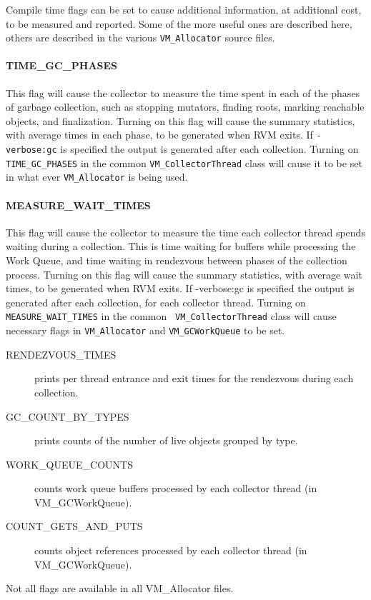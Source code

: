 Compile time flags can be set to cause additional information, at additional
cost, to be measured and reported.  Some of the more useful ones are
described here, others are described in the various {\tt VM\_Allocator}
source files.

\paragraph{TIME\_GC\_PHASES}
This flag will cause the collector to measure the time spent in each
of the phases of garbage collection, such as stopping mutators, finding roots,
marking reachable objects, and finalization.  Turning on this flag will cause
the summary statistics, with average times in each phase, to be generated 
when RVM exits.  If {\tt -verbose:gc} is specified the output is generated after
each collection. Turning on {\tt TIME\_GC\_PHASES} in the common 
{\tt VM\_CollectorThread}
class will cause it to be set in what ever 
{\tt VM\_Allocator} is being used.

\paragraph{MEASURE\_WAIT\_TIMES}
This flag will cause the collector to measure the time each collector thread
spends waiting during a collection.  This is time waiting for buffers while
processing the Work Queue, and time waiting in rendezvous between phases of the
collection process. Turning on this flag will cause
the summary statistics, with average wait times, to be generated 
when RVM exits.  If -verbose:gc is specified the output is generated after
each collection, for each collector thread.
Turning on {\tt MEASURE\_WAIT\_TIMES} in the common {\tt
VM\_CollectorThread}
class will cause necessary flags in {\tt VM\_Allocator} and 
{\tt VM\_GCWorkQueue} to be set.

\begin{description}
\item[RENDEZVOUS\_TIMES] prints per thread entrance and exit times for the
rendezvous during each collection.
\item[GC\_COUNT\_BY\_TYPES] prints counts of the number of live objects grouped
by type.
\item[WORK\_QUEUE\_COUNTS] counts work queue buffers processed by each collector
thread (in VM\_GCWorkQueue). 
\item[COUNT\_GETS\_AND\_PUTS] counts object references processed by each collector
thread (in VM\_GCWorkQueue). 
\end{description}
Not all flags are available in all VM\_Allocator files.
